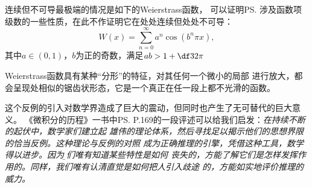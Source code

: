 连续但不可导最极端的情况是如下的{\kaishu Weierstrass函数}，
可以证明\ps{涉及函数项级数的一些性质，在此不作证明}它在处处连续但处处不可导：	
$$W(x)=\sum\limits_{n=0}^{\infty}a^n\cos(b^n\pi x),$$
其中$a\in(0,1)$，$b$为正的奇数，满足$ab>1+\df32\pi$
\begin{center}
	
	\kaishu Weierstrass函数具有某种“分形”的特征，对其任何一个微小的局部
	进行放大，都会呈现处相似的锯齿状形态，它是一个真正在任一段上都不光滑的函数。
\end{center}

这个反例的引入对数学界造成了巨大的震动，但同时也产生了无可替代的巨大意义。
《微积分的历程》一书中\ps{P.169}的一段评述可以给我们启发：{\it 在持续不断的起伏中，数学家们建立起
雄伟的理论体系，然后寻找足以揭示他们的思想界限的恰当反例。这种理论与反例的对照
成为正确推理的引擎，凭借这种工具，数学得以进步。因为{\b 我们唯有知道某些特性是如何
丧失的，方能了解它们是怎样发挥作用的。同样，我们唯有认清直觉是如何把人引入歧途
的，方能如实地评价推理的威力。}}

